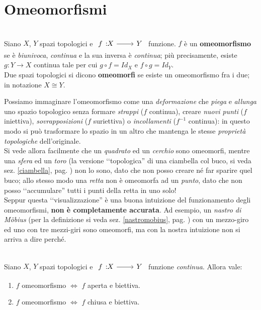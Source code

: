 \section{Omeomorfismi}
\begin{define}[Omeomorfismo.]~{}\\
Siano $X$, $Y$ spazi topologici e $\funz{f}{X}{Y}$ funzione. $f$ è un \textbf{omeomorfismo} se è \textit{biunivoca}, \textit{continua} e la sua inversa è \textit{continua}; più precisamente, esiste $g\colon Y\rightarrow X$ continua tale per cui $g\circ f = Id_{X}$ e $f\circ g = Id_{Y}$.\\
Due spazi topologici si dicono \textbf{omeomorfi} se esiste un omeomorfismo fra i due; in notazione $X\cong Y$.
\end{define}
\begin{intuit}
	Possiamo immaginare l'omeomorfismo come una \textit{deformazione} che \textit{piega} e \textit{allunga} uno spazio topologico senza formare \textit{strappi} ($f$ continua), creare \textit{nuovi punti} ($f$ iniettiva), \textit{sovrapposizioni} ($f$ suriettiva) o \textit{incollamenti} ($f^{-1}$ continua): in questo modo si può trasformare lo spazio in un altro che mantenga le stesse \textit{proprietà topologiche} dell'originale.\\
	Si vede allora facilmente che un \textit{quadrato} ed un \textit{cerchio} sono omeomorfi, mentre una \textit{sfera} ed un \textit{toro} (la versione ‘‘topologica'' di una ciambella col buco, si veda sez. \ref{ciambella}, pag. \pageref{ciambella}) non lo sono, dato che non posso creare né far sparire quel buco; allo stesso modo una \textit{retta} non è omeomorfa ad un \textit{punto}, dato che non posso ‘‘accumulare'' tutti i punti della retta in uno solo!\\
	Seppur questa ‘‘visualizzazione'' è una buona intuizione del funzionamento degli omeomorfismi, \textbf{non è completamente accurata}. Ad esempio, un \textit{nastro di Möbius} (per la definizione si veda sez. \ref{nastromobius}, pag. \pageref{nastromobius}) con un mezzo-giro ed uno con tre mezzi-giri sono omeomorfi, ma con la nostra intuizione non si arriva a dire perché.
\end{intuit}
\begin{lemming}~{}\\
Siano $X$, $Y$ spazi topologici e $\funz{f}{X}{Y}$ funzione \textit{continua}. Allora vale:
\begin{enumerate}
\item $f$ omeomorfismo $\iff$ $f$ aperta e biettiva.
\item $f$ omeomorfismo $\iff$ $f$ chiusa e biettiva.
\end{enumerate}
\vspace{-3mm}
\end{lemming}
